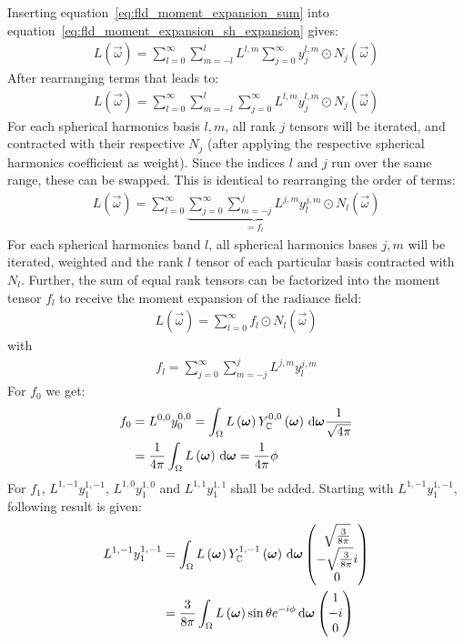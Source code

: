 Inserting equation~\ref{eq:fld_moment_expansion_sum} into equation~\ref{eq:fld_moment_expansion_sh_expansion} gives:
\begin{align}
L\left(\vec{\omega}\right) =
\sum_{l=0}^{\infty}\sum_{m=-l}^{l}L^{l,m}\sum_{j=0}^\infty{y^{l,m}_j\odot N_j(\vec{\omega})}
\end{align}
After rearranging terms that leads to:
\begin{align}
L\left(\vec{\omega}\right) =
\sum_{l=0}^{\infty}\sum_{m=-l}^{l}\sum_{j=0}^\infty{L^{l,m}y^{l,m}_j\odot N_j(\vec{\omega})}
\end{align}
For each spherical harmonics basis $l,m$, all rank $j$ tensors will be iterated, and contracted with their respective $N_j$ (after applying the respective spherical harmonics coefficient as weight). Since the indices $l$ and $j$ run over the same range, these can be swapped. This is identical to rearranging the order of terms:
\begin{align}
L\left(\vec{\omega}\right) =
\sum_{l=0}^{\infty}\underbrace{\sum_{j=0}^\infty\sum_{m=-j}^{j}{L^{j,m}y^{j,m}_l}}_{=f_l}
\odot N_l(\vec{\omega})
\end{align}
For each spherical harmonics band $l$, all spherical harmonics bases $j,m$ will be iterated, weighted and the rank $l$ tensor of each particular basis contracted with $N_l$. Further, the sum of equal rank tensors can be factorized into the moment tensor $f_l$ to receive the moment expansion of the radiance field:
\begin{align}
L\left(\vec{\omega}\right) =
\sum_{l=0}^{\infty}f_l\odot N_l(\vec{\omega})
\end{align}
with
\begin{align}
f_l = \sum_{j=0}^\infty\sum_{m=-j}^{j}{L^{j,m}y^{j,m}_l}
\end{align}
For $f_0$ we get:
\begin{align}
f_0 &= L^{0,0}y^{0,0}_0 = \int_\Omega{L\left(\boldsymbol{\mathbf{\omega}}\right)Y_{\mathbb{C}}^{0,0}\left(\boldsymbol{\mathbf{\omega}}\right)\,\mathrm{d}\boldsymbol{\mathbf{\omega}}}\frac{1}{\sqrt{4\pi}}\\
&=
\frac{1}{4\pi}\int_\Omega{L\left(\boldsymbol{\mathbf{\omega}}\right)\,\mathrm{d}\boldsymbol{\mathbf{\omega}}} =
\frac{1}{4\pi}\phi
\end{align}
For $f_1$, $L^{1,-1}y^{1,-1}_1$, $L^{1,0}y^{1,0}_1$ and $L^{1,1}y^{1,1}_1$ shall be added. Starting with $L^{1,-1}y^{1,-1}_1$, following result is given:
\begin{align}
L^{1,-1}y^{1,-1}_1 &= 
\int_\Omega{L\left(\boldsymbol{\mathbf{\omega}}\right)Y_{\mathbb{C}}^{1,-1}\left(\boldsymbol{\mathbf{\omega}}\right)\,\mathrm{d}\boldsymbol{\mathbf{\omega}}}
\begin{pmatrix}\sqrt{\frac{3}{8\pi}}  \\ -\sqrt{\frac{3}{8\pi}}i \\ 0 \end{pmatrix}
\\
&= 
\frac{3}{8\pi}\int_\Omega{L\left(\boldsymbol{\mathbf{\omega}}\right)\operatorname{sin}\theta e^{-i\phi}\,\mathrm{d}\boldsymbol{\mathbf{\omega}}}
\begin{pmatrix}1  \\ -i \\ 0 \end{pmatrix}
\end{align}
